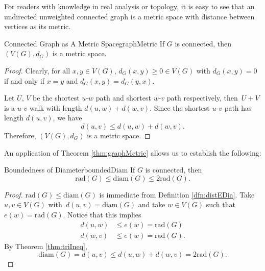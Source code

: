 \documentclass[math, code]{amznotes}
\theoremstyle{remark}
\begin{document}
For readers with knowledge in real analysis or topology, it is easy to see that an undirected unweighted connected graph is a metric space with distance between vertices as its metric. 
\begin{thmbox}{Connected Graph as A Metric Space}{graphMetric}
    If $G$ is connected, then $(V(G), d_G)$ is a metric space.
    \tcblower   
    \begin{proof}
        Clearly, for all $x, y \in V(G)$, $d_G(x, y) \geq 0 \in V(G)$ with $d_G(x, y) = 0$ if and only if $x = y$ and $d_G(x, y) = d_G(y, x)$.

        Let $U$, $V$ be the shortest $u$-$w$ path and shortest $w$-$v$ path respectively, then~$U + V$ is a $u$-$v$ walk with length $d(u, w) + d(w, v)$. Since the shortest $u$-$v$ path has length $d(u, v)$, we have
        \begin{equation*}
            d(u, v) \leq d(u, w) + d(w, v).
        \end{equation*}
        Therefore, $(V(G), d_G)$ is a metric space.
    \end{proof}
\end{thmbox}
An application of Theorem \ref{thm:graphMetric} allows us to establish the following:
\begin{thmbox}{Boundedness of Diameter}{boundedDiam}
    If $G$ is connected, then
    \begin{equation*}
        \mathrm{rad}(G) \leq \mathrm{diam}(G) \leq 2\mathrm{rad}(G).
    \end{equation*}
    \tcblower
    \begin{proof}
        $\mathrm{rad}(G) \leq \mathrm{diam}(G)$ is immediate from Definition \ref{dfn:distEDia}. Take $u, v \in V(G)$ with~$d(u, v) = \mathrm{diam}(G)$ and take $w \in V(G)$ such that $e(w) = \mathrm{rad}(G)$. Notice that this implies
        \begin{align*}
            d(u, w) & \leq e(w) = \mathrm{rad}(G) \\
            d(w, v) & \leq e(w) = \mathrm{rad}(G).
        \end{align*}
        By Theorem \ref{thm:triIneq}, 
        \begin{equation*}
            \mathrm{diam}(G) = d(u, v) \leq d(u, w) + d(w, v) = 2\mathrm{rad}(G).
        \end{equation*}
    \end{proof}
\end{thmbox}
\end{document}
